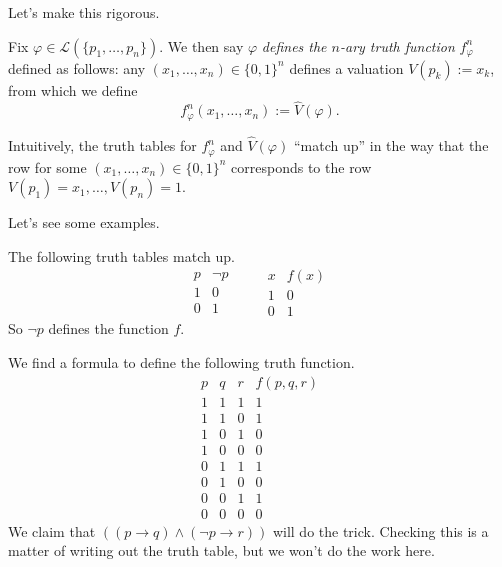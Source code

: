 Let's make this rigorous.
\begin{definition}
	Fix $\varphi\in\mathcal L(\{p_1,\ldots,p_n\})$. We then say $\varphi$ \textit{defines the $n$-ary truth function} $f_\varphi^n$ defined as follows: any $(x_1,\ldots,x_n)\in\{0,1\}^n$ defines a valuation $V(p_k):=x_k$, from which we define
	\[f_\varphi^n(x_1,\ldots,x_n):=\hat V(\varphi).\]
\end{definition}
Intuitively, the truth tables for $f^n_\varphi$ and $\hat V(\varphi)$ ``match up'' in the way that the row for some $(x_1,\ldots,x_n)\in\{0,1\}^n$ corresponds to the row $V(p_1)=x_1,\ldots,V(p_n)=1$.

Let's see some examples.
\begin{example}
	The following truth tables match up.
	\[\begin{array}{c|c}
		p & \lnot p\\
		\hline
		1 & 0 \\
		0 & 1
	\end{array}\qquad\begin{array}{c|c}
		x & f(x) \\
		\hline
		1 & 0 \\
		0 & 1
	\end{array}\]
	So $\lnot p$ defines the function $f$.
\end{example}
\begin{ex}
	We find a formula to define the following truth function.
	\[\begin{array}{c|c|c||c}
		p & q & r & f(p,q,r) \\
		\hline
		1 & 1 & 1 & 1 \\
		1 & 1 & 0 & 1 \\
		1 & 0 & 1 & 0 \\
		1 & 0 & 0 & 0 \\
		0 & 1 & 1 & 1 \\
		0 & 1 & 0 & 0 \\
		0 & 0 & 1 & 1 \\
		0 & 0 & 0 & 0
	\end{array}\]
	We claim that $((p\to q)\land(\lnot p\to r))$ will do the trick. Checking this is a matter of writing out the truth table, but we won't do the work here.
\end{ex}

